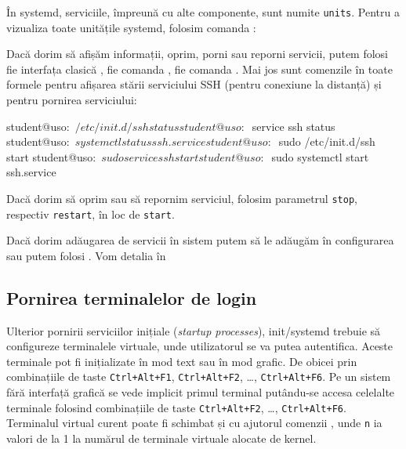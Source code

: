 În systemd, serviciile, împreună cu alte componente, sunt numite \texttt{units}. Pentru a
vizualiza toate unitățile systemd, folosim comanda :


Dacă dorim să afișăm informații, oprim, porni sau reporni servicii, putem folosi
fie interfața clasică , fie comanda , fie comanda .
Mai jos sunt comenzile în toate formele pentru afișarea stării serviciului SSH (pentru conexiune
la distanță) și pentru pornirea serviciului:

\begin{screen}
student@uso:~$ /etc/init.d/ssh status
student@uso:~$ service ssh status
student@uso:~$ systemctl status ssh.service
student@uso:~$ sudo /etc/init.d/ssh start
student@uso:~$ sudo service ssh start
student@uso:~$ sudo systemctl start ssh.service
\end{screen}

Dacă dorim să oprim sau să repornim serviciul, folosim parametrul \texttt{stop},
respectiv \texttt{restart}, în loc de \texttt{start}.

Dacă dorim adăugarea de servicii în sistem putem să le adăugăm în configurarea
 sau putem folosi . Vom detalia în

\subsection{Pornirea terminalelor de login}
\label{sec:boot:init-linux:login}

Ulterior pornirii serviciilor inițiale (\textit{startup processes}), init/systemd trebuie să
configureze terminalele virtuale, unde utilizatorul se va putea autentifica. Aceste terminale
pot fi inițializate în mod text sau în mod grafic.
De obicei prin combinațiile de taste \texttt{Ctrl+Alt+F1}, \texttt{Ctrl+Alt+F2}, \ldots,
\texttt{Ctrl+Alt+F6}. Pe un sistem fără interfață grafică se
vede implicit primul terminal putându-se accesa celelalte terminale folosind
combinațiile de taste \texttt{Ctrl+Alt+F2}, \ldots, \texttt{Ctrl+Alt+F6}.
Terminalul virtual curent poate fi schimbat și cu ajutorul comenzii , unde \texttt{n} ia
valori de la 1 la numărul de terminale virtuale alocate de kernel.


